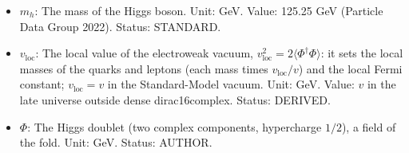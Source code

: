 \documentclass[
  10pt,
]{article}
\begin{document}
\begin{itemize}
  computations, below 23 meV by DESI DR2 with the CMB and NuFIT 6.0.
  Status: STANDARD.
\item
  \(m_h\): The mass of the Higgs boson. Unit: GeV. Value: 125.25 GeV
  (Particle Data Group 2022). Status: STANDARD.
\item
  \(v_{\mathrm{loc}}\): The local value of the electroweak vacuum,
  \(v_{\mathrm{loc}}^2 = 2\langle\Phi^\dagger\Phi\rangle\): it sets the
  local masses of the quarks and leptons (each mass times
  \(v_{\mathrm{loc}}/v\)) and the local Fermi constant;
  \(v_{\mathrm{loc}} = v\) in the Standard-Model vacuum. Unit: GeV.
  Value: \(v\) in the late universe outside dense dirac16complex.
  Status: DERIVED.
\item
  \(\Phi\): The Higgs doublet (two complex components, hypercharge
  \(1/2\)), a field of the fold. Unit: GeV. Status: AUTHOR.
\end{itemize}
\end{document}
